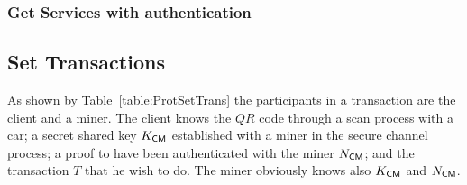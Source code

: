 

\subsubsection{Get Services with authentication}
\label{ssec:getServAuth}





\subsection{Set Transactions} 
\label{ssec:setTrans}

As shown by Table~\ref{table:ProtSetTrans} the participants in a transaction 
are the client and a miner.
The client knows the $QR$ code through a scan process with
a car; a secret shared key $K_{\textsf{C}\textsf{M}}$ established with
a miner in the secure channel process; a proof to have been authenticated
with the miner $N_{\textsf{C}\textsf{M}}$; and the transaction $T$ that he wish to do. 
The miner obviously knows also $K_{\textsf{C}\textsf{M}}$ and $N_{\textsf{C}\textsf{M}}$. 
